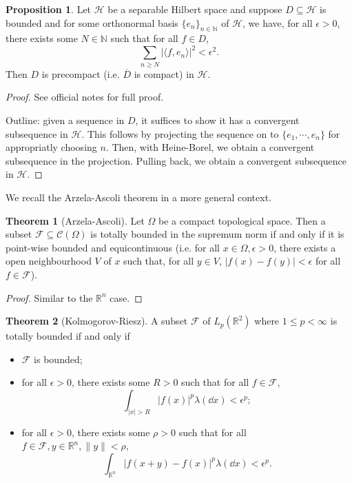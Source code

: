 \documentclass[]{article}
\theoremstyle{definition}
\newtheorem{theorem}{Theorem}
\theoremstyle{definition}
\newtheorem{proposition}{Proposition}[section]
\begin{document}
\begin{proposition}
  Let \(\mathcal{H}\) be a separable Hilbert space and suppose 
  \(D \subseteq \mathcal{H}\) is bounded and for some orthonormal basis 
  \(\{e_n\}_{n \in \mathbb{N}}\) of \(\mathcal{H}\), we have, for all 
  \(\epsilon > 0\), there exists some \(N \in \mathbb{N}\) such that 
  for all \(f \in D\),
  \[\sum_{n \ge N} |\langle f, e_n \rangle|^2 < \epsilon^2.\]
  Then \(D\) is precompact (i.e. \(\overline{D}\) is compact) in \(\mathcal{H}\).
\end{proposition}
\begin{proof}
  See official notes for full proof. 
  
  Outline: given a sequence in \(D\), it 
  suffices to show it has a convergent subsequence in \(\mathcal{H}\). This 
  follows by projecting the sequence on to \(\{e_1, \cdots, e_n\}\) for 
  appropriatly choosing \(n\). Then, with Heine-Borel, we obtain a 
  convergent subsequence in the projection. Pulling back, we obtain a 
  convergent subsequence in \(\mathcal{H}\).
\end{proof}

We recall the Arzela-Ascoli theorem in a more general context.

\begin{theorem}[Arzela-Ascoli]
  Let \(\Omega\) be a compact topological space. Then a subset 
  \(\mathcal{F} \subseteq \mathcal{C}(\Omega)\) is totally bounded in the 
  supremum norm if and only if it is point-wise bounded and equicontinuous 
  (i.e. for all \(x \in \Omega, \epsilon > 0\), there exists a open neighbourhood
  \(V\) of \(x\) such that, for all \(y \in V\), \(|f(x) - f(y)| < \epsilon\) 
  for all \(f \in \mathcal{F}\)).
\end{theorem}
\begin{proof}
  Similar to the \(\mathbb{R}^n\) case.
\end{proof}

\begin{theorem}[Kolmogorov-Riesz]
  A subset \(\mathcal{F}\) of \(L_p(\mathbb{R}^2)\) where \(1 \le p < \infty\) 
  is totally bounded if and only if 
  \begin{itemize}
    \item \(\mathcal{F}\) is bounded;
    \item for all \(\epsilon > 0\), there exists some \(R > 0\) such that for 
      all \(f \in \mathcal{F}\), 
      \[\int_{|x| > R} |f(x)|^p \lambda(\dd x) < \epsilon^p;\]
    \item for all \(\epsilon > 0\), there exists some \(\rho > 0\) such that 
      for all \(f \in \mathcal{F}, y \in \mathbb{R}^n, \|y\| < \rho\), 
      \[\int_{\mathbb{R}^n} |f(x + y) - f(x)|^p \lambda(\dd x) < \epsilon^p.\]
  \end{itemize}
\end{theorem}
\end{document}
